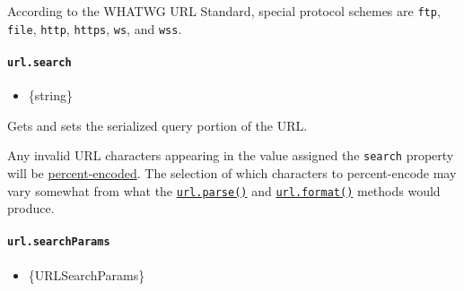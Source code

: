 According to the WHATWG URL Standard, special protocol schemes are
\texttt{ftp}, \texttt{file}, \texttt{http}, \texttt{https}, \texttt{ws},
and \texttt{wss}.

\paragraph{\texorpdfstring{\texttt{url.search}}{url.search}}\label{url.search}

\begin{itemize}
\tightlist
\item
  \{string\}
\end{itemize}

Gets and sets the serialized query portion of the URL.

\begin{Shaded}
\begin{Highlighting}[]
\OperatorTok{=}  \NormalTok{(}\NormalTok{)}\OperatorTok{;}
\NormalTok{)}\OperatorTok{;}

 \OperatorTok{=} \OperatorTok{;}
\NormalTok{)}\OperatorTok{;}
\end{Highlighting}
\end{Shaded}

Any invalid URL characters appearing in the value assigned the
\texttt{search} property will be
\hyperref[percent-encoding-in-urls]{percent-encoded}. The selection of
which characters to percent-encode may vary somewhat from what the
\hyperref[urlparseurlstring-parsequerystring-slashesdenotehost]{\texttt{url.parse()}}
and \hyperref[urlformaturlobject]{\texttt{url.format()}} methods would
produce.

\paragraph{\texorpdfstring{\texttt{url.searchParams}}{url.searchParams}}\label{url.searchparams}

\begin{itemize}
\tightlist
\item
  \{URLSearchParams\}
\end{itemize}

